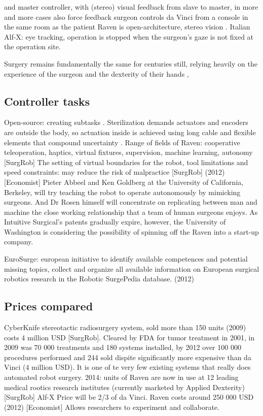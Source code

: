 and master controller, with (stereo) visual feedback from slave to master, in more and more cases also force feedback
surgeon controls da Vinci from a console in the same room as the patient
Raven is open-architecture, stereo vision \citep{bib:raven_debride}.
Italian Alf-X: eye tracking, operation is stopped when the surgeon's gaze is not fixed at the operation site.

Surgery remains fundamentally the same for centuries still, relying heavily on the experience of the surgeon and the dexterity of their hands \citep{bib:docatadist},


\subsection{Controller tasks}
Open-source: creating subtasks \citep{bib:raven_debride}.
Sterilization demands actuators and encoders are outside the body, so actuation inside is achieved using long cable and flexible elements that compound uncertainty \citep{bib:raven_debride}.
Range of fields of Raven: cooperative teleoperation, haptics, virtual fixtures, supervision, machine learning, autonomy [SurgRob]
The setting of virtual boundaries for the robot, tool limitations and speed constraints: may reduce the risk of malpractice [SurgRob]
(2012) [Economist] Pieter Abbeel and Ken Goldberg at the University of California, Berkeley, will try teaching the robot to operate autonomously by mimicking surgeons. And Dr Rosen himself will concentrate on replicating between man and machine the close working relationship that a team of human surgeons enjoys. As Intuitive Surgical's patents gradually expire, however, the University of Washington is considering the possibility of spinning off the Raven into a start-up company.




EuroSurge: european initiative to identify available competences and potential missing topics, collect and organize all available information on European surgical robotics research in the Robotic SurgePedia database. (2012)



\subsection{Prices compared}
CyberKnife stereotactic radiosurgery system, sold more than 150 units (2009) costs 4 million USD [SurgRob]. Cleared by FDA for tumor treatment in 2001, in 2009 was 70 000 treatments and 180 systems installed, by 2012 over 100 000 procedures performed and 244 sold dispite significantly more expensive than da Vinci (4 million USD). It is one of te very few existing systems that really does automated robot surgery.
2014: units of Raven are now in use at 12 leading medical rootics research institutes (currently marketed by Applied Dexterity) [SurgRob]
Alf-X Price will be 2/3 of da Vinci. 
Raven costs around 250 000 USD (2012) [Economist] Allows researchers to experiment and collaborate.








